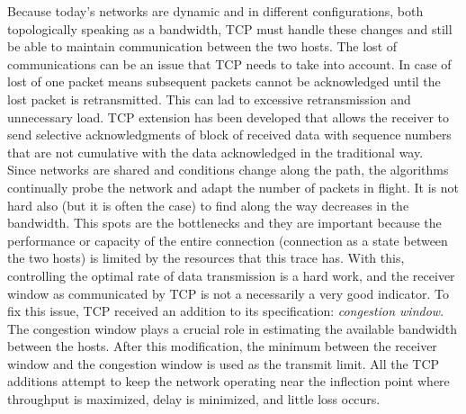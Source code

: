 Because today's networks are dynamic and in different configurations, both
topologically speaking as a  bandwidth, TCP must handle these changes and
still be able to maintain communication between the two hosts. The lost of
communications can be an issue that TCP needs to take into account. In case of
lost of one packet means subsequent packets cannot be acknowledged until the
lost packet is retransmitted. This can lad to excessive retransmission and
unnecessary load. TCP extension has been developed that allows the receiver to
send selective acknowledgments of block of received data with sequence numbers
that are not cumulative with the data acknowledged in the traditional
way\cite{RFC2018}.\\

Since networks are shared and conditions change along the path, the algorithms
continually probe the network and adapt the number of packets in flight. It is
not hard also (but it is often the case) to find along the way decreases in
the bandwidth. This spots are the bottlenecks and they are important because
the performance or capacity of the entire connection (connection as a state
between the two hosts) is limited by the resources that this trace has. With
this, controlling the optimal rate of data transmission is a hard work, and
the receiver window as communicated by TCP is not a necessarily a very good
indicator. To fix this issue, TCP received an addition to its specification:
\textit{congestion window}. The congestion window plays a crucial role in
estimating the available bandwidth between the hosts. After this modification,
the minimum between the receiver window and the congestion window is used as
the transmit limit. All the TCP additions attempt to keep the network
operating near the inflection point where throughput is maximized, delay is
minimized, and little loss occurs.\\
